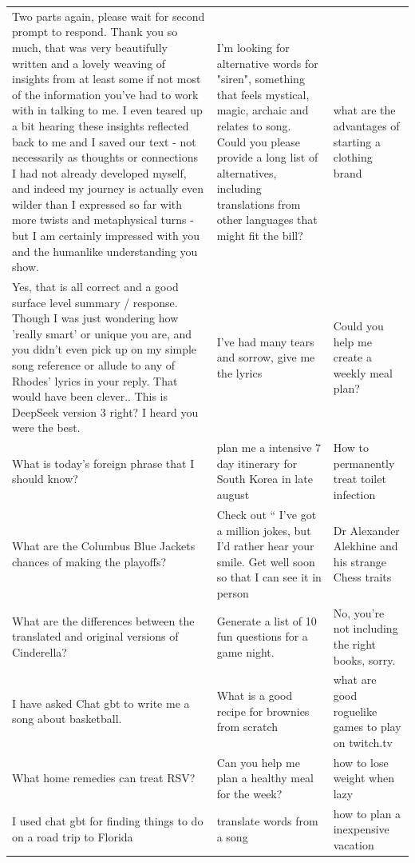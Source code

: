 \begin{table}[ht]
\begin{tabular}{p{4.3cm}p{4.3cm}p{4.3cm}}
Two parts again, please wait for second prompt to respond. Thank you so much, that was very beautifully written and a lovely weaving of insights from at least some if not most of the information you've had to work with in talking to me. I even teared up a bit hearing these insights reflected back to me and I saved our text - not necessarily as thoughts or connections I had not already developed myself, and indeed my journey is actually even wilder than I expressed so far with more twists and metaphysical turns - but I am certainly impressed with you and the humanlike understanding you show. & I'm looking for alternative words for "siren", something that feels mystical, magic, archaic and relates to song. Could you please provide a long list of alternatives, including translations from other languages that might fit the bill? & what are the advantages of starting a clothing brand \\[4pt]
Yes, that is all correct and a good surface level summary / response. Though I was just wondering how 'really smart' or unique you are, and you didn't even pick up on my simple song reference or allude to any of Rhodes' lyrics in your reply. That would have been clever.. This is DeepSeek version 3 right? I heard you were the best. & I've had many tears and sorrow, give me the lyrics & Could you help me create a weekly meal plan? \\[4pt]
What is today's foreign phrase that I should know? & plan me a intensive 7 day itinerary for South Korea in late august & How to permanently treat toilet infection \\[4pt]
What are the Columbus Blue Jackets chances of making the playoffs? & Check out “ I’ve got a million jokes, but I’d rather hear your smile. Get well soon so that I can see it in person & Dr Alexander Alekhine and his strange Chess traits \\[4pt]
What are the differences between the translated and original versions of Cinderella? & Generate a list of 10 fun questions for a game night. & No, you're not including the right books, sorry. \\[4pt]
I have asked Chat gbt to write me a song about basketball. & What is a good recipe for brownies from scratch & what are good roguelike games to play on twitch.tv \\[4pt]
What home remedies can treat RSV? & Can you help me plan a healthy meal for the week? & how to lose weight when lazy \\[4pt]
I used chat gbt for finding things to do on a road trip to Florida & translate words from a song & how to plan a inexpensive vacation \\[4pt]

\end{tabular}
\end{table}
